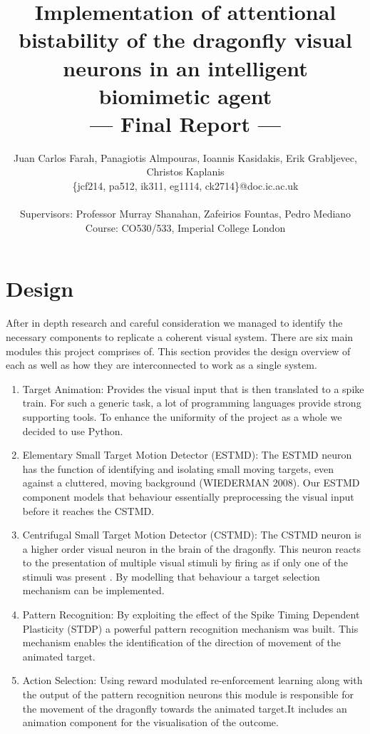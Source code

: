 \documentclass[a4paper,11pt]{article}
\title{Implementation of attentional bistability of the dragonfly visual neurons in an intelligent biomimetic agent\\\Large{--- Final Report ---}}
\author{Juan Carlos Farah, Panagiotis Almpouras, Ioannis Kasidakis, Erik Grabljevec, Christos Kaplanis\\
       \{jcf214, pa512, ik311, eg1114, ck2714\}@doc.ic.ac.uk\\ \\
       \small{Supervisors: Professor Murray Shanahan, Zafeirios Fountas, Pedro Mediano}\\
       \small{Course: CO530/533, Imperial College London}
}
\begin{document}
\maketitle

\section{Design}

After in depth research and careful consideration we managed to identify the necessary components to replicate a coherent visual system.
There are six main modules this project comprises of. This section provides the design overview of each as well as how they are interconnected to work as a single system.

\begin{enumerate}
\item{Target Animation:} Provides the visual input that is then translated to a spike train. For such a generic task, a lot of programming languages provide strong supporting tools. To enhance the uniformity of the project as a whole we decided to use Python.\cite{python}
\item{Elementary Small Target Motion Detector (ESTMD):} The ESTMD neuron has the function of identifying and isolating small moving targets, even against a cluttered, moving background (WIEDERMAN 2008). Our ESTMD component models that behaviour essentially preprocessing the visual input before it reaches the CSTMD.
\item{Centrifugal Small Target Motion Detector (CSTMD):} The CSTMD neuron is a higher order visual neuron in the brain of the dragonfly. This neuron reacts to the presentation of multiple visual stimuli by firing as if only one of the stimuli was present \cite{w13}. By modelling that behaviour a target selection mechanism can be implemented.
\item{Pattern Recognition:} By exploiting the effect of the Spike Timing Dependent Plasticity (STDP) a powerful pattern recognition mechanism was built\cite{stdp1}\cite{stdp2}. This mechanism enables the identification of the direction of movement of the animated target.
\item{Action Selection:} Using reward modulated re-enforcement learning along with the output of the pattern recognition neurons this module is responsible for the movement of the dragonfly towards the animated target.It includes an animation component for the visualisation of the outcome.

\end{enumerate}
\end{document}
